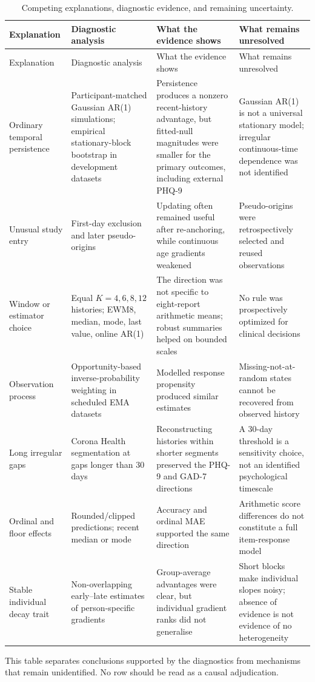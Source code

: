 \documentclass[pdflatex,sn-vancouver-num]{sn-jnl}
\begin{document}
\FloatBarrier
\begingroup
\footnotesize
\setlength{\LTleft}{0pt}
\setlength{\LTright}{0pt}
\begin{longtable}{@{}p{1.8cm}p{3.0cm}p{3.4cm}p{3.4cm}@{}}
\caption{Competing explanations, diagnostic evidence, and remaining uncertainty.}\label{tab:s24}\\
\toprule
Explanation & Diagnostic analysis & What the evidence shows & What remains unresolved\\
\midrule
\endfirsthead
\toprule
Explanation & Diagnostic analysis & What the evidence shows & What remains unresolved\\
\midrule
\endhead
Ordinary temporal persistence & Participant-matched Gaussian AR(1) simulations; empirical stationary-block bootstrap in development datasets & Persistence produces a nonzero recent-history advantage, but fitted-null magnitudes were smaller for the primary outcomes, including external PHQ-9 & Gaussian AR(1) is not a universal stationary model; irregular continuous-time dependence was not identified\\
Unusual study entry & First-day exclusion and later pseudo-origins & Updating often remained useful after re-anchoring, while continuous age gradients weakened & Pseudo-origins were retrospectively selected and reused observations\\
Window or estimator choice & Equal $K=4,6,8,12$ histories; EWM8, median, mode, last value, online AR(1) & The direction was not specific to eight-report arithmetic means; robust summaries helped on bounded scales & No rule was prospectively optimized for clinical decisions\\
Observation process & Opportunity-based inverse-probability weighting in scheduled EMA datasets & Modelled response propensity produced similar estimates & Missing-not-at-random states cannot be recovered from observed history\\
Long irregular gaps & Corona Health segmentation at gaps longer than 30 days & Reconstructing histories within shorter segments preserved the PHQ-9 and GAD-7 directions & A 30-day threshold is a sensitivity choice, not an identified psychological timescale\\
Ordinal and floor effects & Rounded/clipped predictions; recent median or mode & Accuracy and ordinal MAE supported the same direction & Arithmetic score differences do not constitute a full item-response model\\
Stable individual decay trait & Non-overlapping early--late estimates of person-specific gradients & Group-average advantages were clear, but individual gradient ranks did not generalise & Short blocks make individual slopes noisy; absence of evidence is not evidence of no heterogeneity\\
\bottomrule
\end{longtable}
\begin{flushleft}\footnotesize This table separates conclusions supported by the diagnostics from mechanisms that remain unidentified. No row should be read as a causal adjudication.\end{flushleft}
\endgroup
\end{document}

